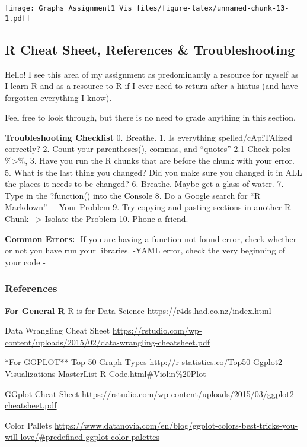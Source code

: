 \documentclass[
]{article}
\begin{document}
\texttt{[image: Graphs\_Assignment1\_Vis\_files/figure-latex/unnamed-chunk-13-1.pdf]}

\hypertarget{r-cheat-sheet-references-troubleshooting}{%
\subsection{R Cheat Sheet, References \&
Troubleshooting}\label{r-cheat-sheet-references-troubleshooting}}

Hello! I see this area of my assignment as predominantly a resource for
myself as I learn R and as a resource to R if I ever need to return
after a hiatus (and have forgotten everything I know).

Feel free to look through, but there is no need to grade anything in
this section.

\textbf{Troubleshooting Checklist} 0. Breathe. 1. Is everything
spelled/cApiTAlized correctly? 2. Count your parentheses(), commas, and
``quotes'' 2.1 Check poles \%\textgreater\%, \textbar{} 3. Have you run
the R chunks that are before the chunk with your error. 5. What is the
last thing you changed? Did you make sure you changed it in ALL the
places it needs to be changed? 6. Breathe. Maybe get a glass of water.
7. Type in the ?function() into the Console 8. Do a Google search for
``R Markdown'' + Your Problem 9. Try copying and pasting sections in
another R Chunk --\textgreater{} Isolate the Problem 10. Phone a friend.

\textbf{Common Errors:} -If you are having a function not found error,
check whether or not you have run your libraries. -YAML error, check the
very beginning of your code -

\hypertarget{references}{%
\subsubsection{References}\label{references}}

\textbf{For General R} R is for Data Science
\url{https://r4ds.had.co.nz/index.html}

Data Wrangling Cheat Sheet
\url{https://rstudio.com/wp-content/uploads/2015/02/data-wrangling-cheatsheet.pdf}

*For GGPLOT** Top 50 Graph Types
\url{http://r-statistics.co/Top50-Ggplot2-Visualizations-MasterList-R-Code.html\#Violin\%20Plot}

GGplot Cheat Sheet
\url{https://rstudio.com/wp-content/uploads/2015/03/ggplot2-cheatsheet.pdf}

Color Pallets
\url{https://www.datanovia.com/en/blog/ggplot-colors-best-tricks-you-will-love/\#predefined-ggplot-color-palettes}
\end{document}
